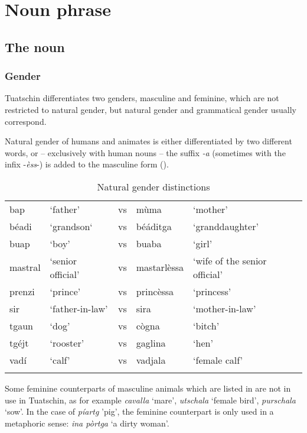 \chapter{Noun phrase}

\section{The noun}

\subsection{Gender}
Tuatschin differentiates two genders, masculine and feminine, which are not restricted to natural gender, but natural gender and grammatical gender usually correspond.

Natural gender of humans and animates is either differentiated by two different words, or – exclusively with human nouns – the suffix \textit{-a} (sometimes with the infix -\textit{èss}-) is added to the masculine form ().

\begin{table}
\caption{Natural gender distinctions}
\label{tab:nouns:gendis}
\begin{tabular}{lllll}
 \lsptoprule
  \midrule
  bap & `father' & vs & mùma & `mother'\\
  béadi & `grandson` & vs & béáditga & `granddaughter' \citet{DRG1: 60}\\ %
buap& `boy' & vs & buaba &`girl'\\
mastral & `senior official' & vs & mastarlèssa & `wife of the senior official' \\
prenzi & `prince' & vs & princèssa & `princess'\\
sir & `father-in-law' & vs & sira & `mother-in-law'\\
tgaun & `dog' & vs & cògna & `bitch'\\
tgéjt & `rooster' &vs& gaglina & `hen'\\
vadí & `calf' & vs & vadjala & `female calf'\\
\lspbottomrule
\end{tabular}
\end{table}

Some feminine counterparts of masculine animals which are listed in \citet{Spescha1989} are not in use in Tuatschin, as for example \textit{cavalla} `mare', \textit{utschala} `female bird', \textit{purschala} `sow'. In the case of \textit{píartg} 'pig', the feminine counterpart is only used in a metaphoric sense: \textit{ina pòrtga} `a dirty woman'.

